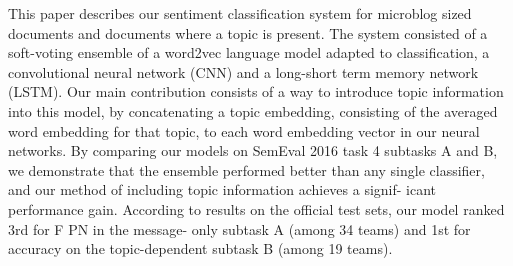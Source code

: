 This paper describes our sentiment classification system for microblog sized documents and documents where a topic is present. The system consisted of a soft-voting ensemble of a word2vec language model adapted to classification, a convolutional neural network (CNN) and a long-short term memory network (LSTM). Our main contribution consists of a way to introduce topic information into this model, by concatenating a topic embedding, consisting of the averaged word embedding for that topic, to each word embedding vector in our neural networks. By comparing our models on SemEval 2016 task 4 subtasks A and B, we demonstrate that the ensemble performed better than any single classifier, and our method of including topic information achieves a signif- icant performance gain. According to results on the official test sets, our model ranked 3rd for F PN in the message- only subtask A (among 34 teams) and 1st for accuracy on the topic-dependent subtask B (among 19 teams).
